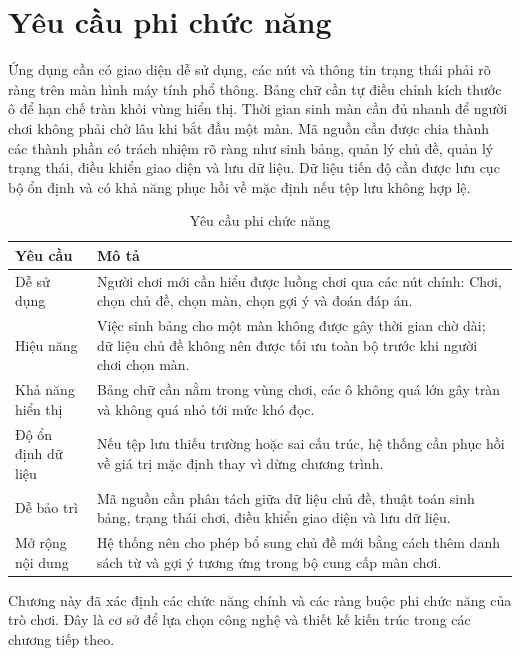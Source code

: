 \documentclass[../DoAn.tex]{subfiles}
\begin{document}
\section{Yêu cầu phi chức năng}
\label{section:2.4}
Ứng dụng cần có giao diện dễ sử dụng, các nút và thông tin trạng thái phải rõ ràng trên màn hình máy tính phổ thông. Bảng chữ cần tự điều chỉnh kích thước ô để hạn chế tràn khỏi vùng hiển thị. Thời gian sinh màn cần đủ nhanh để người chơi không phải chờ lâu khi bắt đầu một màn. Mã nguồn cần được chia thành các thành phần có trách nhiệm rõ ràng như sinh bảng, quản lý chủ đề, quản lý trạng thái, điều khiển giao diện và lưu dữ liệu. Dữ liệu tiến độ cần được lưu cục bộ ổn định và có khả năng phục hồi về mặc định nếu tệp lưu không hợp lệ.

\begin{table}[H]
\centering
\begin{tabularx}{\textwidth}{|>{\RaggedRight\arraybackslash}p{3.2cm}|>{\RaggedRight\arraybackslash}X|}
\hline
\textbf{Yêu cầu} & \textbf{Mô tả} \\ \hline
Dễ sử dụng & Người chơi mới cần hiểu được luồng chơi qua các nút chính: Chơi, chọn chủ đề, chọn màn, chọn gợi ý và đoán đáp án. \\ \hline
Hiệu năng & Việc sinh bảng cho một màn không được gây thời gian chờ dài; dữ liệu chủ đề không nên được tối ưu toàn bộ trước khi người chơi chọn màn. \\ \hline
Khả năng hiển thị & Bảng chữ cần nằm trong vùng chơi, các ô không quá lớn gây tràn và không quá nhỏ tới mức khó đọc. \\ \hline
Độ ổn định dữ liệu & Nếu tệp lưu thiếu trường hoặc sai cấu trúc, hệ thống cần phục hồi về giá trị mặc định thay vì dừng chương trình. \\ \hline
Dễ bảo trì & Mã nguồn cần phân tách giữa dữ liệu chủ đề, thuật toán sinh bảng, trạng thái chơi, điều khiển giao diện và lưu dữ liệu. \\ \hline
Mở rộng nội dung & Hệ thống nên cho phép bổ sung chủ đề mới bằng cách thêm danh sách từ và gợi ý tương ứng trong bộ cung cấp màn chơi. \\ \hline
\end{tabularx}
\caption{Yêu cầu phi chức năng}
\label{table:nonfunctional}
\end{table}

Chương này đã xác định các chức năng chính và các ràng buộc phi chức năng của trò chơi. Đây là cơ sở để lựa chọn công nghệ và thiết kế kiến trúc trong các chương tiếp theo.
\end{document}
